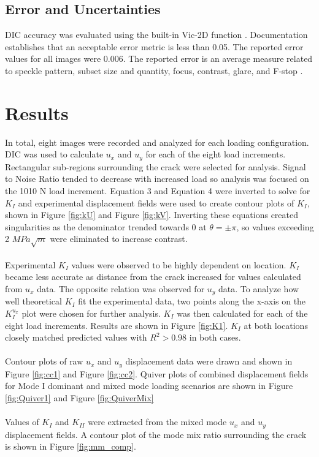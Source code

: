 \documentclass[12pt]{article}
\begin{document}
\subsection{Error and Uncertainties} %
DIC accuracy was evaluated using the built-in Vic-2D function \cite{Vic-2D}. Documentation establishes that an acceptable error metric is less than 0.05. The reported error values for all images were 0.006. The reported error is an average measure related to speckle pattern, subset size and quantity, focus, contrast, glare, and F-stop \cite{DIC_Err}.  

\section{Results}%
In total, eight images were recorded and analyzed for each loading configuration. DIC was used to calculate $u_x$ and $u_y$ for each of the eight load increments. Rectangular sub-regions surrounding the crack were selected for analysis. Signal to Noise Ratio tended to decrease with increased load so analysis was focused on the 1010 N load increment. Equation 3 and Equation 4 were inverted to solve for $K_I$ and experimental displacement fields were used to create contour plots of $K_I$, shown in Figure \ref{fig:kU} and Figure \ref{fig:kV}. Inverting these equations created singularities as the denominator trended towards 0 at $\theta = \pm \pi$, so values exceeding 2 $MPa\sqrt{m}$ were eliminated to increase contrast. 
\\ \\
Experimental $K_I$ values were observed to be highly dependent on location. $K_I$ became less accurate as distance from the crack increased for values calculated from $u_x$ data. The opposite relation was observed for $u_y$ data. To analyze how well theoretical $K_I$ fit the experimental data, two points along the x-axis on the $K_I^{u_x}$ plot were chosen for further analysis. $K_I$ was then calculated for each of the eight load increments. Results are shown in Figure \ref{fig:K1}. $K_I$ at both locations closely matched predicted values with $R^2>0.98$ in both cases. 
\\ \\
Contour plots of raw $u_x$ and $u_y$ displacement data were drawn and shown in Figure \ref{fig:cc1} and Figure \ref{fig:cc2}. Quiver plots of combined displacement fields for Mode I dominant and mixed mode loading scenarios are shown in Figure \ref{fig:Quiver1} and Figure \ref{fig:QuiverMix}
\\ \\
Values of $K_I$ and $K_{II}$ were extracted from the mixed mode $u_x$ and $u_y$ displacement fields. A contour plot of the mode mix ratio surrounding the crack is shown in Figure \ref{fig:mm_comp}. 
\end{document}
